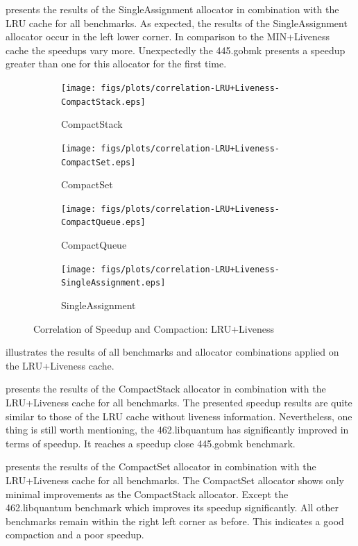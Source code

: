\documentclass[onecolumn, openright, master, english, signatures]{dbrgrptt}
\begin{document}
 presents the results of the SingleAssignment allocator in combination with the \ac{LRU} cache for all benchmarks.
As expected, the results of the SingleAssignment allocator occur in the left lower corner.
In comparison to the \ac{MIN}+Liveness cache the speedups vary more.
Unexpectedly the 445.gobmk presents a speedup greater than one for this allocator for the first time.

\begin{figure}[!ht]
  \begin{subfigure}[b]{0.5\textwidth}%
    \texttt{[image: figs/plots/correlation-LRU+Liveness-CompactStack.eps]}
    \caption{CompactStack}
    \label{fig:correlation-lru-liveness-compactstack}
  \end{subfigure}%
  \begin{subfigure}[b]{0.5\textwidth}%
    \texttt{[image: figs/plots/correlation-LRU+Liveness-CompactSet.eps]}
    \caption{CompactSet}
    \label{fig:correlation-lru-liveness-compactset}
  \end{subfigure}%
  \qquad
  \begin{subfigure}[b]{0.5\textwidth}%
    \texttt{[image: figs/plots/correlation-LRU+Liveness-CompactQueue.eps]}
    \caption{CompactQueue}
    \label{fig:correlation-lru-liveness-compactqueue}
  \end{subfigure}%
  \begin{subfigure}[b]{0.5\textwidth}%
    \texttt{[image: figs/plots/correlation-LRU+Liveness-SingleAssignment.eps]}
    \caption{SingleAssignment}
    \label{fig:correlation-lru-liveness-singleassignment}
  \end{subfigure}%
  \caption{Correlation of Speedup and Compaction: LRU+Liveness}
  \label{fig:correlation-lru-liveness}
\end{figure}

 illustrates the results of all benchmarks and allocator combinations applied on the \ac{LRU}+Liveness cache.

 presents the results of the CompactStack allocator in combination with the \ac{LRU}+Liveness cache for all benchmarks.
The presented speedup results are quite similar to those of the \ac{LRU} cache without liveness information.
Nevertheless, one thing is still worth mentioning, the 462.libquantum has significantly improved in terms of speedup.
It reaches a speedup close 445.gobmk benchmark.

 presents the results of the CompactSet allocator in combination with the \ac{LRU}+Liveness cache for all benchmarks.
The CompactSet allocator shows only minimal improvements as the CompactStack allocator.
Except the 462.libquantum benchmark which improves its speedup significantly.
All other benchmarks remain within the right left corner as before.
This indicates a good compaction and a poor speedup.
\end{document}
